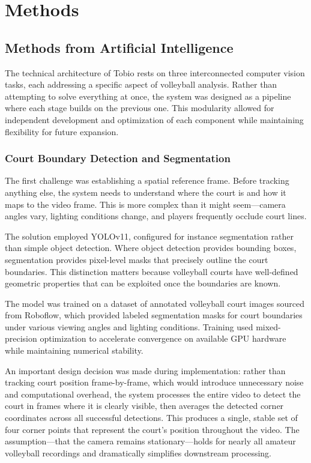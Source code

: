 \chapter{Methods}

\section{Methods from Artificial Intelligence}

The technical architecture of Tobio rests on three interconnected computer vision tasks, each addressing a specific aspect of volleyball analysis. Rather than attempting to solve everything at once, the system was designed as a pipeline where each stage builds on the previous one. This modularity allowed for independent development and optimization of each component while maintaining flexibility for future expansion.

\subsection{Court Boundary Detection and Segmentation}

The first challenge was establishing a spatial reference frame. Before tracking anything else, the system needs to understand where the court is and how it maps to the video frame. This is more complex than it might seem—camera angles vary, lighting conditions change, and players frequently occlude court lines.

The solution employed YOLOv11, configured for instance segmentation rather than simple object detection. Where object detection provides bounding boxes, segmentation provides pixel-level masks that precisely outline the court boundaries. This distinction matters because volleyball courts have well-defined geometric properties that can be exploited once the boundaries are known.

The model was trained on a dataset of annotated volleyball court images sourced from Roboflow, which provided labeled segmentation masks for court boundaries under various viewing angles and lighting conditions. Training used mixed-precision optimization to accelerate convergence on available GPU hardware while maintaining numerical stability.

An important design decision was made during implementation: rather than tracking court position frame-by-frame, which would introduce unnecessary noise and computational overhead, the system processes the entire video to detect the court in frames where it is clearly visible, then averages the detected corner coordinates across all successful detections. This produces a single, stable set of four corner points that represent the court's position throughout the video. The assumption—that the camera remains stationary—holds for nearly all amateur volleyball recordings and dramatically simplifies downstream processing.

